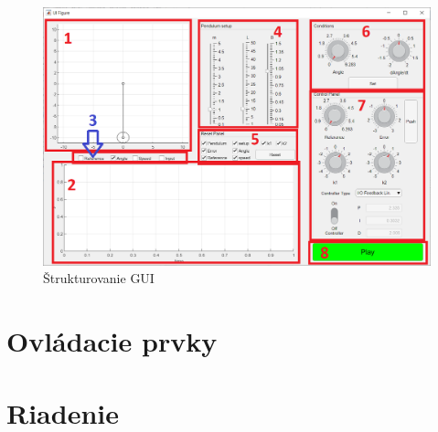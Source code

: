 \begin{figure}[t!]
	\centering
	\includegraphics[width=0.9\linewidth]{structgui}
	\caption{Štrukturovanie GUI}
	\label{fig:structgui}
\end{figure}
 
 
\clearpage
\section{Ovládacie prvky}
\newpage
\section{Riadenie}

    
    

